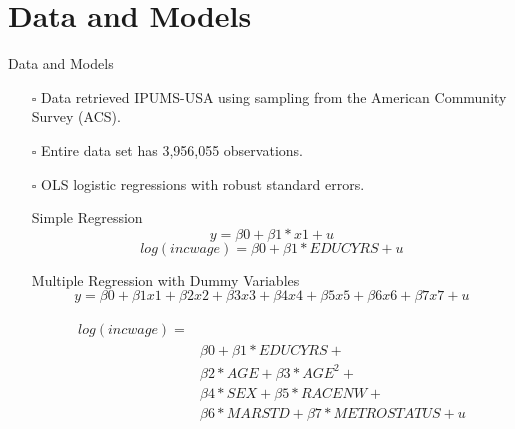 \documentclass[9pt]{beamer}
\begin{document}
\section{Data and Models}
\begin{frame}{Data and Models}
\begin{itemize}
  \setlength\itemsep{1em}
\item[$\square$] Data retrieved IPUMS-USA using sampling from the American Community Survey (ACS). 
\item[$\square$] Entire data set has 3,956,055 observations.
\item[$\square$] OLS logistic regressions with robust standard errors.


\itemsep{$-$} Simple Regression 
\begin{equation}
y = \beta0 + \beta1*x1 + u
\end{equation}
\begin{equation}
    log(incwage) = \beta0 + \beta1*EDUCYRS + u 
\end{equation}

\itemsep{$-$} Multiple Regression with Dummy Variables 
    \begin{equation}
    y = \beta0 + \beta1x1+ \beta2x2+ \beta3x3 + \beta4x4 + \beta5x5 + \beta6x6 + \beta7x7 + u 
\end{equation}

\begin{equation}
\begin{aligned}
\begin{split}
log(incwage) = \\
&   \beta0 + \beta1*EDUCYRS + \\
&  \beta2*AGE+ \beta3*AGE^2 + \\
&  \beta4*SEX + \beta5*RACENW + \\
&  \beta6*MARSTD +\beta7*METROSTATUS + u
\end{split}
\end{aligned}
\end{equation}

\end{itemize} 
\end{frame}
\end{document}
